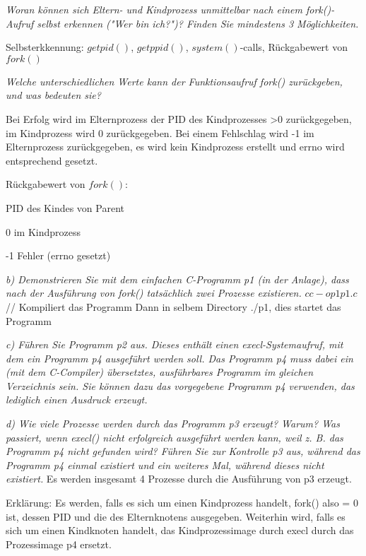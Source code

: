 \documentclass[a4paper]{article}
\begin{document}
\textit{Woran können sich Eltern- und Kindprozess unmittelbar nach einem fork()-Aufruf selbst erkennen ("Wer bin ich?")? Finden Sie mindestens 3 Möglichkeiten. }

Selbsterkkennung: $getpid()$, $getppid()$, $system()$-calls, Rückgabewert von $fork()$

\textit{Welche unterschiedlichen Werte kann der Funktionsaufruf fork() zurückgeben, und was bedeuten sie?}
\vspace{10mm}

Bei Erfolg wird im Elternprozess der PID des Kindprozesses >0 zurückgegeben, im Kindprozess wird 0 zurückgegeben. Bei einem Fehlschlag wird -1 im Elternprozess zurückgegeben, es wird kein Kindprozess erstellt und errno wird entsprechend gesetzt.

Rückgabewert von $fork()$:
\begin{itemize*}
    \item PID des Kindes von Parent
    \item 0 im Kindprozess
    \item -1 Fehler (errno gesetzt)
\end{itemize*}

\textit{b) Demonstrieren Sie mit dem einfachen C-Programm p1 (in der Anlage), dass nach der Ausführung von fork() tatsächlich zwei Prozesse existieren.}
\vspace{10mm}
$cc -o p1 p1.c$ // Kompiliert das Programm
Dann in selbem Directory ./p1, dies startet das Programm


\textit{c) Führen Sie Programm p2 aus. Dieses enthält einen execl-Systemaufruf, mit dem ein Programm p4 ausgeführt werden soll. Das Programm p4 muss dabei ein (mit dem C-Compiler) übersetztes, ausführbares Programm im gleichen Verzeichnis sein. Sie können dazu das vorgegebene Programm p4 verwenden, das lediglich einen Ausdruck erzeugt.}
\vspace{10mm}


\textit{d) Wie viele Prozesse werden durch das Programm p3 erzeugt? Warum? Was passiert, wenn execl() nicht erfolgreich ausgeführt werden kann, weil z. B. das Programm p4 nicht gefunden wird? Führen Sie zur Kontrolle p3 aus, während das Programm p4 einmal existiert und ein weiteres Mal, während dieses nicht existiert.}
\vspace{10mm}
Es werden insgesamt 4 Prozesse durch die Ausführung von p3 erzeugt.

Erklärung:
Es werden, falls es sich um einen Kindprozess handelt, fork() also = 0 ist, dessen PID und die des Elternknotens ausgegeben.
Weiterhin wird, falls es sich um einen Kindknoten handelt, das Kindprozessimage durch execl durch das Prozessimage p4 ersetzt.
\end{document}

